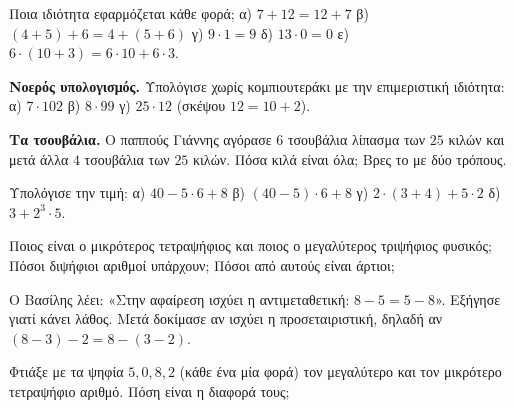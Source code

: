 \ex Ποια ιδιότητα εφαρμόζεται κάθε φορά; α) $7+12=12+7$ \quad β) $(4+5)+6=4+(5+6)$ \quad γ) $9\cdot 1=9$ \quad δ) $13\cdot 0=0$ \quad ε) $6\cdot(10+3)=6\cdot 10+6\cdot 3$.


\ex \textbf{Νοερός υπολογισμός.} Υπολόγισε χωρίς κομπιουτεράκι με την επιμεριστική ιδιότητα: α) $7\cdot 102$ \quad β) $8\cdot 99$ \quad γ) $25\cdot 12$ (σκέψου $12=10+2$).

\ex \textbf{Τα τσουβάλια.} Ο παππούς Γιάννης αγόρασε $6$ τσουβάλια λίπασμα των $25$ κιλών και μετά άλλα $4$ τσουβάλια των $25$ κιλών. Πόσα κιλά είναι όλα; Βρες το με δύο τρόπους.

\ex Υπολόγισε την τιμή: α) $40-5\cdot 6+8$ \quad β) $(40-5)\cdot 6+8$ \quad γ) $2\cdot(3+4)+5\cdot 2$ \quad δ) $3+2^3\cdot 5$.


\ex Ποιος είναι ο μικρότερος τετραψήφιος και ποιος ο μεγαλύτερος τριψήφιος φυσικός; Πόσοι διψήφιοι αριθμοί υπάρχουν; Πόσοι από αυτούς είναι άρτιοι;

\ex Ο Βασίλης λέει: «Στην αφαίρεση ισχύει η αντιμεταθετική: $8-5=5-8$». Εξήγησε γιατί κάνει λάθος. Μετά δοκίμασε αν ισχύει η προσεταιριστική, δηλαδή αν $(8-3)-2=8-(3-2)$.


\ex Φτιάξε με τα ψηφία $5,0,8,2$ (κάθε ένα μία φορά) τον μεγαλύτερο και τον μικρότερο τετραψήφιο αριθμό. Πόση είναι η διαφορά τους;
